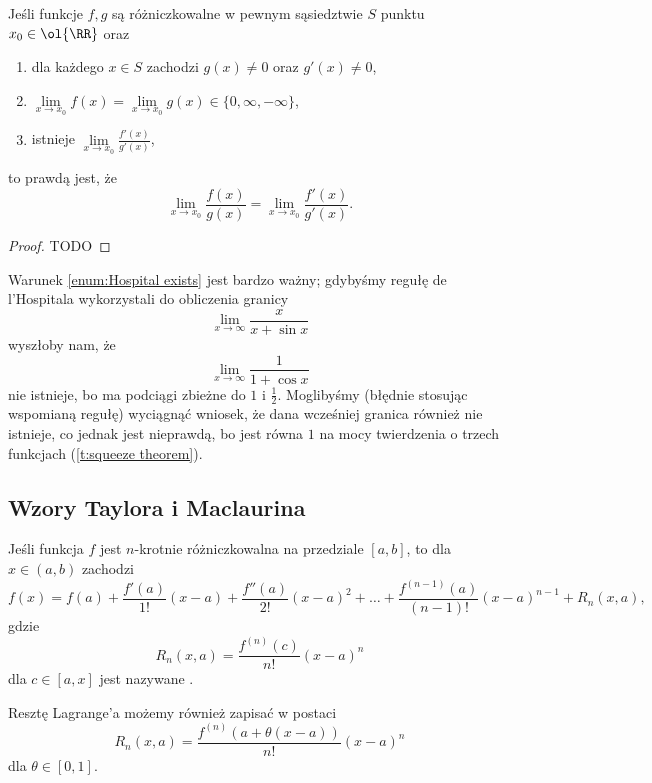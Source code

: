 \begin{theorem}
    \label{t:Hospital}
    Jeśli funkcje $f, g$ są różniczkowalne w pewnym sąsiedztwie $S$ punktu $x_0 \in \ol{\RR}$ oraz
    \begin{enumerate}
        \item dla każdego $x \in S$ zachodzi $g(x) \neq 0$ oraz $g'(x) \neq 0$,
        \item $\lim\limits_{x\to x_0} f(x) = \lim\limits_{x\to x_0} g(x) \in \{0, \infty, -\infty\}$,
        \item \label{enum:Hospital exists} istnieje $\lim\limits_{x\to x_0}\frac{f'(x)}{g'(x)}$,
    \end{enumerate}
    to prawdą jest, że
    \[ \lim_{x\to x_0}\frac{f(x)}{g(x)} = \lim_{x\to x_0}\frac{f'(x)}{g'(x)}. \]
\end{theorem}
\begin{proof}
    TODO
\end{proof}
\begin{remark}
    Warunek \ref{enum:Hospital exists} jest bardzo ważny; gdybyśmy regułę de l'Hospitala wykorzystali do obliczenia granicy
    \[ \lim_{x\to\infty}\frac{x}{x + \sin x} \]
    wyszłoby nam, że
    \[ \lim_{x\to\infty}\frac{1}{1 + \cos x} \]
    nie istnieje, bo ma podciągi zbieżne do $1$ i $\frac{1}{2}$. Moglibyśmy (błędnie stosując wspomianą regułę) wyciągnąć wniosek, że dana wcześniej granica również nie istnieje, co jednak jest nieprawdą, bo jest równa $1$ na mocy twierdzenia o trzech funkcjach (\ref{t:squeeze theorem}).
\end{remark}

\subsection{Wzory Taylora i Maclaurina}
\begin{theorem}[Taylora]
    \label{t:Taylor}
    Jeśli funkcja $f$ jest $n$-krotnie różniczkowalna na przedziale $[a, b]$, to dla $x \in (a, b)$ zachodzi
    \[ f(x) = f(a) + \frac{f'(a)}{1!}(x - a) + \frac{f''(a)}{2!}(x - a)^2 + \ldots + \frac{f^{(n-1)}(a)}{(n-1)!}(x - a)^{n-1} + R_n(x, a), \]
    gdzie
    \[ R_n(x, a) = \frac{f^{(n)}(c)}{n!}(x - a)^n \]
    dla $c \in [a, x]$ jest nazywane .
\end{theorem}

Resztę Lagrange'a możemy również zapisać w postaci
\[ R_n(x, a) = \frac{f^{(n)}(a + \theta(x - a))}{n!}(x - a)^n \]
dla $\theta \in [0, 1]$.

